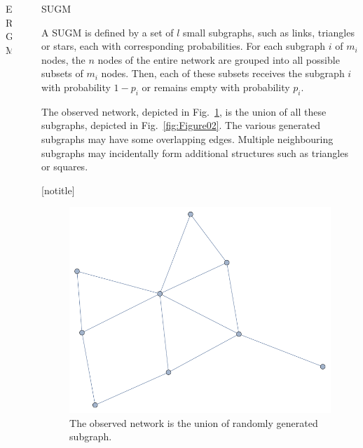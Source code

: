 \documentclass[final]{beamer}
\newlength{\sepwid}
\newlength{\onecolwid}
\newlength{\threecolwid}
\begin{document}
\begin{frame}[t]
\begin{columns}[t]
\begin{column}{\threecolwid}
\begin{columns}[t,totalwidth=\threecolwid]
\begin{column}{\onecolwid}
\begin{block}{ERGM}
\end{block}

\end{column} %

\begin{column}{\sepwid}\end{column} %

\begin{column}{\onecolwid}\vspace{-.6in} %

\begin{block}{SUGM}

A SUGM is defined by a set of $l$ small subgraphs, such as links, triangles or stars, each with corresponding probabilities. For each subgraph $i$ of $m_{i}$ nodes, the $n$ nodes of the entire network are grouped into all possible subsets of $m_{i}$ nodes. Then, each of these subsets receives the subgraph $i$ with probability $1-p_{i}$ or remains empty with probability $p_{i}$.

The observed network, depicted in Fig.~\ref{fig:Figure01}, is the union of all these subgraphs, depicted in Fig.~\ref{fig:Figure02}. The various generated subgraphs may have some overlapping edges. Multiple neighbouring subgraphs may incidentally form additional structures such as triangles or squares.

\end{block}

[notitle]
\begin{block}

\begin{figure}
\includegraphics[width=0.8\linewidth]{../Figure02_1.pdf}
\caption{The observed network is the union of randomly generated subgraph.}
\label{fig:Figure01}
\end{figure}


\end{block}
\end{column}
\end{columns}
\end{column}
\end{columns}
\end{frame}
\end{document}
